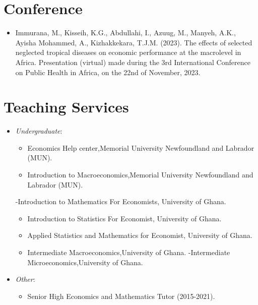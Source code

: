 \documentclass[
  letterpaper,
  DIV=11,
  numbers=noendperiod]{scrartcl}
\providecommand{\tightlist}{%
  \setlength{\itemsep}{0pt}\setlength{\parskip}{0pt}}\usepackage{longtable,booktabs,array}
\begin{document}
\hypertarget{conference}{%
\section{Conference}\label{conference}}

\begin{itemize}
\tightlist
\item
  Immurana, M., Kisseih, K.G., Abdullahi, I., Azuug, M., Manyeh, A.K.,
  Ayisha Mohammed, A., Kizhakkekara, T.J.M. (2023). The effects of
  selected neglected tropical diseases on economic performance at the
  macrolevel in Africa. Presentation (virtual) made during the 3rd
  International Conference on Public Health in Africa, on the 22nd of
  November, 2023.
\end{itemize}

\hypertarget{teaching-services}{%
\section{Teaching Services}\label{teaching-services}}

\begin{itemize}
\item
  \emph{Undergraduate}:

  \begin{itemize}
  \item
    Economics Help center,Memorial University Newfoundland and Labrador
    (MUN).
  \item
    Introduction to Macroeconomics,Memorial University Newfoundland and
    Labrador (MUN).
  \end{itemize}

  -Introduction to Mathematics For Economists, University of Ghana.

  \begin{itemize}
  \item
    Introduction to Statistics For Economist, University of Ghana.
  \item
    Applied Statistics and Mathematics for Economist, University of
    Ghana.
  \item
    Intermediate Macroeconomics,University of Ghana. -Intermediate
    Microeconomics,University of Ghana.
  \end{itemize}
\item
  \emph{Other}:

  \begin{itemize}
  \tightlist
  \item
    Senior High Economics and Mathematics Tutor (2015-2021).
  \end{itemize}
\end{itemize}
\end{document}
